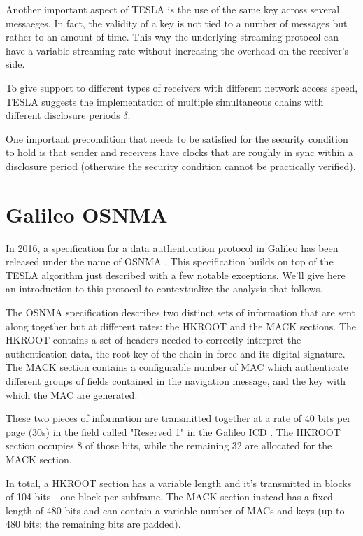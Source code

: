 Another important aspect of TESLA is the use of the same key across several
messaeges. In fact, the validity of a key is not tied to a number of messages
but rather to an amount of time. This way the underlying streaming protocol can
have a variable streaming rate without increasing the overhead on the receiver's
side.

To give support to different types of receivers with different network access
speed, TESLA suggests the implementation of multiple simultaneous chains with
different disclosure periods $\delta$.

One important precondition that needs to be satisfied for the security condition
to hold is that sender and receivers have clocks that are roughly in sync within
a disclosure period (otherwise the security condition cannot be practically
verified).

\section{Galileo OSNMA}
In 2016, a specification for a data authentication protocol in Galileo has been
released under the name of OSNMA \cite{osnma}. This specification builds on top
of the TESLA algorithm just described with a few notable exceptions. We'll give
here an introduction to this protocol to contextualize the analysis that
follows.

\par

The OSNMA specification describes two distinct sets of information that are sent
along together but at different rates: the HKROOT and the MACK sections. The
HKROOT contains a set of headers needed to correctly interpret the
authentication data, the root key of the chain in force and its digital
signature. The MACK section contains a configurable number of MAC which
authenticate different groups of fields contained in the navigation message, and
the key with which the MAC are generated.

These two pieces of information are transmitted together at a rate of 40 bits
per page (30s) in the field called "Reserved 1" in the Galileo ICD
\cite{galileoicd}. The HKROOT section occupies 8 of those bits, while the
remaining 32 are allocated for the MACK section.


In total, a HKROOT section has a variable length and it's transmitted in blocks
of 104 bits - one block per subframe. The MACK section instead has a fixed
length of 480 bits and can contain a variable number of MACs and keys (up to 480
bits; the remaining bits are padded).

